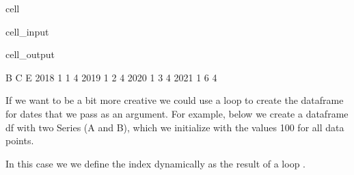 \documentclass[letterpaper,10pt,english]{jupyterBook}
\begin{document}
\begin{sphinxuseclass}{cell}\begin{sphinxVerbatimInput}

\begin{sphinxuseclass}{cell_input}
\begin{sphinxVerbatim}[commandchars=\\\{\}]

   \PYG{p}{[}\PYG{p}{]}\PYG{p}{[}\PYG{p}{]}\PYG{p}{[}\PYG{p}{]}\PYG{p}{[}\PYG{p}{]}
\end{sphinxVerbatim}

\end{sphinxuseclass}\end{sphinxVerbatimInput}
\begin{sphinxVerbatimOutput}

\begin{sphinxuseclass}{cell_output}
\begin{sphinxVerbatim}[commandchars=\\\{\}]
      B  C  E
2018  1  1  4
2019  1  2  4
2020  1  3  4
2021  1  6  4
\end{sphinxVerbatim}

\end{sphinxuseclass}\end{sphinxVerbatimOutput}

\end{sphinxuseclass}
\sphinxAtStartPar
If we want to be a bit more creative we could use a loop to create the dataframe for dates that we pass as an argument.  For example, below we create a dataframe df with two Series (A and B), which we initialize with the values 100 for all data points.

\sphinxAtStartPar
In this case we we define the index dynamically as the result of a loop .
\end{document}
